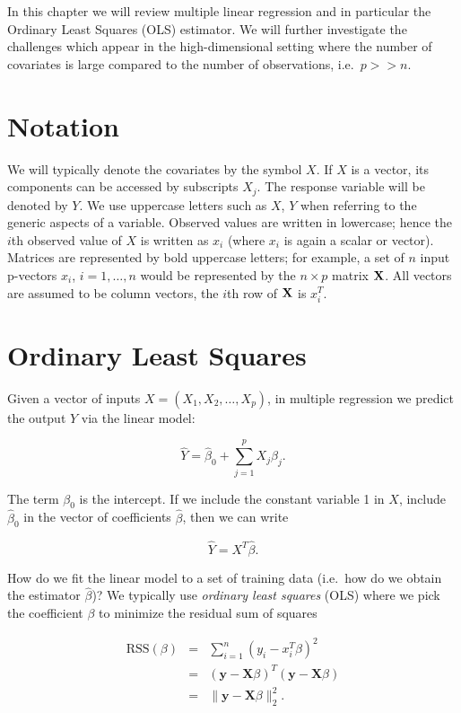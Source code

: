 \documentclass[
]{book}
\begin{document}
In this chapter we will review multiple linear regression and in particular the Ordinary Least Squares (OLS) estimator. We will further investigate the challenges which appear in the high-dimensional setting where the number of covariates is large compared to the number of observations, i.e.~\(p>>n\).

\hypertarget{notation}{%
\section{Notation}\label{notation}}

We will typically denote the covariates by the symbol \(X\). If \(X\) is a vector, its components can be accessed
by subscripts \(X_j\). The response variable will be denoted by \(Y\). We use uppercase letters such as \(X\), \(Y\) when referring to the generic aspects of a variable. Observed values are written in lowercase; hence the \(i\)th observed value of \(X\) is written as \(x_i\) (where \(x_i\) is again a scalar or vector). Matrices are represented by bold uppercase letters; for example, a set of \(n\) input p-vectors \(x_i\), \(i=1,\ldots,n\) would be represented by the \(n\times p\) matrix \(\bf{X}\). All vectors are assumed to be column vectors, the \(i\)th row of \(\bf{X}\) is \(x_i^T\).

\hypertarget{ordinary-least-squares}{%
\section{Ordinary Least Squares}\label{ordinary-least-squares}}

Given a vector of inputs \(X=(X_1,X_2,\ldots,X_p)\), in multiple regression we predict the output \(Y\) via the linear model:

\[ \hat{Y}=\hat\beta_0+\sum_{j=1}^{p}X_j\hat\beta_j.\]

The term \(\beta_0\) is the intercept. If we include the constant variable 1 in \(X\), include \(\hat\beta_0\) in the vector of coefficients \(\hat\beta\), then we can write

\[\hat{Y}=X^T\hat\beta.\]

How do we fit the linear model to a set of training data (i.e.~how do we obtain the estimator \(\hat \beta\))? We typically use \emph{ordinary least squares} (OLS) where we pick the coefficient \(\beta\) to minimize the residual sum of squares

\begin{eqnarray*}
\textrm{RSS}(\beta)&=&\sum_{i=1}^{n}(y_i-x_i^T\beta)^2\\
&=&(\textbf{y} - \textbf{X} \beta)^T (\textbf{y} - \textbf{X} \beta)\\
&=&\|\textbf{y} - \textbf{X} \beta\|^2_2.
\end{eqnarray*}
\end{document}
